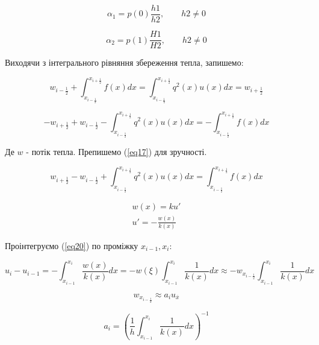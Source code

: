 \documentclass[14pt,a4paper]{scrartcl}
\begin{document}
	\begin{equation}\label{eq14}
		\alpha_{1} = p(0)\frac{h1}{h2},\qquad h2 \ne 0
	\end{equation}
	
	\begin{equation}\label{eq15}
		\alpha_{2} = p(1)\frac{H1}{H2},\qquad h2 \ne 0
	\end{equation}


	Виходячи з інтегрального рівняння збереження тепла, запишемо:
	
	\begin{equation}\label{eq16}
		w_{i-\frac{1}{2}} + \int_{x_{i- \frac{1}{2}}}^{x_{i+\frac{1}{2}}} f(x)dx = \int_{x_{i- \frac{1}{2}}}^{x_{i+\frac{1}{2}}} q^{2}(x)u(x)dx = w_{i+\frac{1}{2}}
	\end{equation}

	\begin{equation}\label{eq17}
		-w_{i+\frac{1}{2}} + w_{i-\frac{1}{2}} - \int_{x_{i- \frac{1}{2}}}^{x_{i+\frac{1}{2}}} q^{2}(x)u(x)dx = -\int_{x_{i- \frac{1}{2}}}^{x_{i+\frac{1}{2}}} f(x)dx
	\end{equation}
	
	Де $w$ - потік тепла. Препишемо (\ref{eq17}) для зручності.
	
	\begin{equation}\label{eq18}
		w_{i+\frac{1}{2}} - w_{i-\frac{1}{2}} + \int_{x_{i- \frac{1}{2}}}^{x_{i+\frac{1}{2}}} q^{2}(x)u(x)dx = \int_{x_{i- \frac{1}{2}}}^{x_{i+\frac{1}{2}}} f(x)dx
	\end{equation}
	
		
	\begin{gather}
		w(x) = ku' \label{eq19}\\
		u' =  - \frac{w(x)}{k(x)} \label{eq20}
	\end{gather}
	
	Проінтегруємо (\ref{eq20}) по проміжку $x_{i-1}, x_{i}$:
	
	\begin{equation} \label{eq21}
		u_{i} - u_{i-1} = - \int_{x_{i-1}}^{x_{i}} \frac{w(x)}{k(x)}dx = -w(\xi)\int_{x_{i-1}}^{x_{i}} \frac{1}{k(x)}dx \approx -w_{x_{i-\frac{1}{2}}}\int_{x_{i-1}}^{x_{i}} \frac{1}{k(x)}dx	
	\end{equation}
	
	\begin{equation}\label{eq22}
		w_{x_{i-\frac{1}{2}}} \approx a_{i}u_{\overline{x}}
	\end{equation}

	\begin{equation}\label{eq23}
		a_{i} = \left( \frac{1}{h}\int_{x_{i-1}}^{x_{i}}\frac{1}{k(x)}dx \right)^{-1}
	\end{equation}
\end{document}
